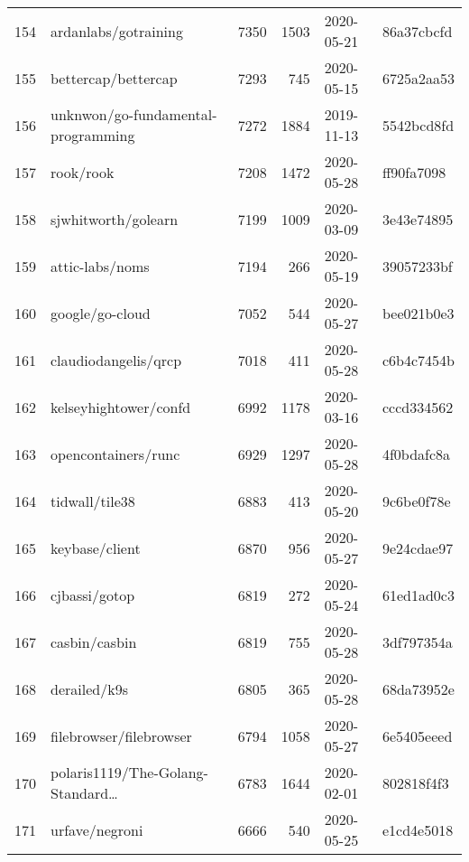 \begin{longtable}{llrrll}
    154 &                               ardanlabs/gotraining &   7350 &   1503 & 2020-05-21 &  86a37cbcfd \\
    155 &                                bettercap/bettercap &   7293 &    745 & 2020-05-15 &  6725a2aa53 \\
    156 &                 unknwon/go-fundamental-programming &   7272 &   1884 & 2019-11-13 &  5542bcd8fd \\
    157 &                                          rook/rook &   7208 &   1472 & 2020-05-28 &  ff90fa7098 \\
    158 &                                sjwhitworth/golearn &   7199 &   1009 & 2020-03-09 &  3e43e74895 \\
    159 &                                    attic-labs/noms &   7194 &    266 & 2020-05-19 &  39057233bf \\
    160 &                                    google/go-cloud &   7052 &    544 & 2020-05-27 &  bee021b0e3 \\
    161 &                               claudiodangelis/qrcp &   7018 &    411 & 2020-05-28 &  c6b4c7454b \\
    162 &                              kelseyhightower/confd &   6992 &   1178 & 2020-03-16 &  cccd334562 \\
    163 &                                opencontainers/runc &   6929 &   1297 & 2020-05-28 &  4f0bdafc8a \\
    164 &                                     tidwall/tile38 &   6883 &    413 & 2020-05-20 &  9c6be0f78e \\
    165 &                                     keybase/client &   6870 &    956 & 2020-05-27 &  9e24cdae97 \\
    166 &                                      cjbassi/gotop &   6819 &    272 & 2020-05-24 &  61ed1ad0c3 \\
    167 &                                      casbin/casbin &   6819 &    755 & 2020-05-28 &  3df797354a \\
    168 &                                       derailed/k9s &   6805 &    365 & 2020-05-28 &  68da73952e \\
    169 &                            filebrowser/filebrowser &   6794 &   1058 & 2020-05-27 &  6e5405eeed \\
    170 &              polaris1119/The-Golang-Standard\ldots &   6783 &   1644 & 2020-02-01 &  802818f4f3 \\
    171 &                                     urfave/negroni &   6666 &    540 & 2020-05-25 &  e1cd4e5018 \\

\end{longtable}
